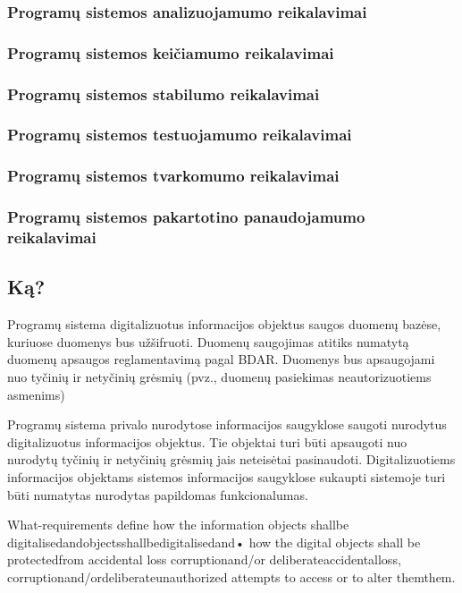 \documentclass{VUMIFPSkursinis}
\begin{document}
	\subsubsection{Programų sistemos analizuojamumo reikalavimai}
	\subsubsection{Programų sistemos keičiamumo reikalavimai}
	\subsubsection{Programų sistemos stabilumo reikalavimai}
	\subsubsection{Programų sistemos testuojamumo reikalavimai}
	\subsubsection{Programų sistemos tvarkomumo reikalavimai}
	\subsubsection{Programų sistemos pakartotino panaudojamumo reikalavimai}


\subsection{Ką?}\label{sec:PSReqWhat}
Programų sistema digitalizuotus informacijos objektus saugos duomenų bazėse, kuriuose duomenys bus užšifruoti. Duomenų saugojimas atitiks numatytą duomenų apsaugos reglamentavimą pagal BDAR. Duomenys bus apsaugojami nuo tyčinių ir netyčinių grėsmių (pvz., duomenų pasiekimas neautorizuotiems asmenims)

Programų sistema privalo nurodytose informacijos saugyklose saugoti
nurodytus digitalizuotus informacijos objektus. Tie objektai turi būti apsaugoti
nuo nurodytų tyčinių ir netyčinių grėsmių jais neteisėtai pasinaudoti.
Digitalizuotiems informacijos objektams sistemos informacijos saugyklose
sukaupti sistemoje turi būti numatytas nurodytas papildomas
funkcionalumas.


What-requirements define how the information objects shallbe digitalisedandobjectsshallbedigitalisedand•  how the digital objects shall be protectedfrom accidental loss  corruptionand/or deliberateaccidentalloss, corruptionand/ordeliberateunauthorized attempts to access or to alter themthem.
\end{document}
